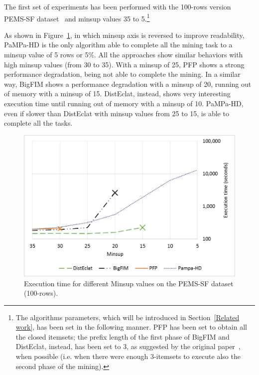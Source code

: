 The first set of experiments has been performed with the 100-rows version PEMS-SF dataset~\cite{uci} and minsup values 35 to 5.\footnote{The algorithms parameters, which will be introduced in Section~\ref{Related work}, has been set in the following manner. PFP has been set to obtain all the closed itemsets; the prefix length of the first phase of BigFIM and DistEclat, instead, has been set to 3, as suggested by the original paper~\cite{bigfim}, when possible (i.e. when there were enough 3-itemsets to execute also the second phase of the mining).}

As shown in Figure~\ref{pems_confronto}, in which minsup axis is reversed to improve readability, PaMPa-HD is the only algorithm able to complete all the mining task to a minsup value of 5 rows or 5\%. All the approaches show similar behaviors with high minsup values (from 30 to 35).
With a minsup of 25, PFP shows a strong performance degradation, being not able to complete the mining.
In a similar way, BigFIM shows a performance degradation with a minsup of 20, running out of memory with a minsup of 15. 
DistEclat, instead, shows very interesting execution time until running out of memory with a minsup of 10.
PaMPa-HD, even if slower than DistEclat with minsup values from 25 to 15, is able to complete all the tasks.


\begin{figure}[!t]
\includegraphics[width=5in]{immagini_extension/pems_confronto.png}
\caption{Execution time for different Minsup values on the PEMS-SF dataset (100-rows).}
\label{pems_confronto}
\end{figure}

